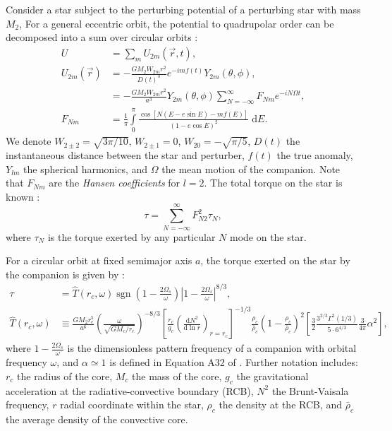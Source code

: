 \documentclass[
        fleqn,
        usenatbib,
        referee,
    ]{mnras}
\newcommand*{\rd}[2]{\frac{\mathrm{d}#1}{\mathrm{d}#2}}
\newcommand*{\abs}[1]{\left|#1\right|}
\newcommand*{\p}[1]{\left(#1\right)}
\newcommand*{\s}[1]{\left[#1\right]}
\DeclareMathOperator*{\sgn}{sgn}
\begin{document}
Consider a star subject to the perturbing potential of a perturbing star with
mass $M_2$, For a general eccentric orbit, the potential to quadrupolar order
can be decomposed into a sum over circular orbits \citep{vlf,sl}:
\begin{align}
    U &= \sum\limits_m U_{2m} \p{\vec{r}, t},\label{eq:u_ecc}\\
    U_{2m}\p{\vec{r}} &= -\frac{GM_2 W_{2m} r^2}{D(t)^3}
            e^{-imf(t)} Y_{2m}(\theta, \phi),\\
        &= -\frac{GM_2W_{2m}r^2}{a^3}Y_{2m}\p{\theta, \phi}
            \sum\limits_{N = -\infty}^\infty F_{Nm}e^{-iN\Omega t},\\
    F_{Nm} &= \frac{1}{\pi}\int\limits_{0}^{\pi}
        \frac{\cos\s{N\p{E - e\sin E} - mf(E)}}
            {\p{1 - e\cos E}^2}\;\mathrm{d}E.
\end{align}
We denote $W_{2 \pm 2} = \sqrt{3\pi/10}$, $W_{2 \pm 1} = 0$, $W_{20} =
-\sqrt{\pi / 5}$, $D(t)$ the instantaneous distance between the star and
perturber, $f(t)$ the true anomaly, $Y_{lm}$ the spherical harmonics, and
$\Omega$ the mean motion of the companion. Note that $F_{Nm}$ are the
\emph{Hansen coefficients} for $l = 2$. The total torque on the star is known
\citep{vlf}:
\begin{equation}
    \tau = \sum\limits_{N = -\infty}^\infty F_{N2}^2 \tau_N,\label{eq:tau_each}
\end{equation}
where $\tau_N$ is the torque exerted by any particular $N$ mode on the star.

For a circular orbit at fixed semimajor axis $a$, the torque exerted on the star
by the companion is given by \citealt{kushnir}:
\begin{align}
    \tau &= \hat{T}(r_c, \omega) \sgn\p{1 - \frac{2\Omega_s}{\omega}}
        \abs{1 - \frac{2\Omega_s}{\omega}}^{8/3}
            \label{eq:kushnir_torque},\\
    \hat{T}(r_c, \omega) &\equiv \frac{GM_2r_c^5}{a^6}
        \p{\frac{\omega}{\sqrt{GM_c/r_c}}}^{-8/3}
        \s{\frac{r_c}{g_c}\p{\rd{N^2}{\ln r}}_{r = r_c}}^{-1/3}
            \frac{\rho_c}{\bar{\rho}_c} \p{1 - \frac{\rho_c}{\bar{\rho}_c}}^2
            \s{\frac{3}{2}\frac{3^{2/3}\Gamma^2(1/3)}{5 \cdot
                6^{4/3}} \frac{3}{4\pi}\alpha^2},
\end{align}
where $1 - \frac{2\Omega_s}{\omega}$ is the dimensionless pattern frequency of a
companion with orbital frequency $\omega$, and $\alpha \simeq 1$ is defined in
Equation A32 of \citealt{kushnir}. Further notation includes: $r_c$ the radius
of the core, $M_c$ the mass of the core, $g_c$ the gravitational acceleration at
the radiative-convective boundary (RCB), $N^2$ the Brunt-Vaisala frequency, $r$
radial coordinate within the star, $\rho_c$ the density at the RCB, and
$\bar{\rho}_c$ the average density of the convective core.
\end{document}
